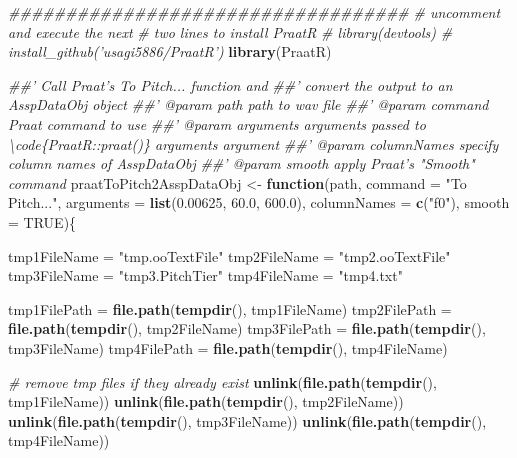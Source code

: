 \documentclass[]{book}
\newenvironment{Shaded}{\begin{snugshade}}{\end{snugshade}}
\newcommand{\CommentTok}[1]{\textcolor[rgb]{0.56,0.35,0.01}{\textit{#1}}}
\newcommand{\ControlFlowTok}[1]{\textcolor[rgb]{0.13,0.29,0.53}{\textbf{#1}}}
\newcommand{\DataTypeTok}[1]{\textcolor[rgb]{0.13,0.29,0.53}{#1}}
\newcommand{\FloatTok}[1]{\textcolor[rgb]{0.00,0.00,0.81}{#1}}
\newcommand{\KeywordTok}[1]{\textcolor[rgb]{0.13,0.29,0.53}{\textbf{#1}}}
\newcommand{\NormalTok}[1]{#1}
\newcommand{\OtherTok}[1]{\textcolor[rgb]{0.56,0.35,0.01}{#1}}
\newcommand{\StringTok}[1]{\textcolor[rgb]{0.31,0.60,0.02}{#1}}
\begin{document}
\begin{Shaded}
\begin{Highlighting}[]
\CommentTok{###################################}
\CommentTok{# uncomment and execute the next}
\CommentTok{# two lines to install PraatR}
\CommentTok{# library(devtools)}
\CommentTok{# install_github('usagi5886/PraatR')}
\KeywordTok{library}\NormalTok{(PraatR)}

\CommentTok{##' Call Praat's To Pitch... function and }
\CommentTok{##' convert the output to an AsspDataObj object}
\CommentTok{##' @param path path to wav file}
\CommentTok{##' @param command Praat command to use}
\CommentTok{##' @param arguments arguments passed to \textbackslash{}code\{PraatR::praat()\} arguments argument}
\CommentTok{##' @param columnNames specify column names of AsspDataObj}
\CommentTok{##' @param smooth apply Praat's "Smooth" command}
\NormalTok{praatToPitch2AsspDataObj <-}\StringTok{ }\ControlFlowTok{function}\NormalTok{(path,}
                                     \DataTypeTok{command =} \StringTok{"To Pitch..."}\NormalTok{,}
                                     \DataTypeTok{arguments =} \KeywordTok{list}\NormalTok{(}\FloatTok{0.00625}\NormalTok{,}
                                                      \FloatTok{60.0}\NormalTok{,}
                                                      \FloatTok{600.0}\NormalTok{),}
                                     \DataTypeTok{columnNames =} \KeywordTok{c}\NormalTok{(}\StringTok{"f0"}\NormalTok{),}
                                     \DataTypeTok{smooth =} \OtherTok{TRUE}\NormalTok{)\{}
  
\NormalTok{  tmp1FileName =}\StringTok{ "tmp.ooTextFile"}
\NormalTok{  tmp2FileName =}\StringTok{ "tmp2.ooTextFile"}
\NormalTok{  tmp3FileName =}\StringTok{ "tmp3.PitchTier"}
\NormalTok{  tmp4FileName =}\StringTok{ "tmp4.txt"}
  
\NormalTok{  tmp1FilePath =}\StringTok{ }\KeywordTok{file.path}\NormalTok{(}\KeywordTok{tempdir}\NormalTok{(), tmp1FileName)}
\NormalTok{  tmp2FilePath =}\StringTok{ }\KeywordTok{file.path}\NormalTok{(}\KeywordTok{tempdir}\NormalTok{(), tmp2FileName)}
\NormalTok{  tmp3FilePath =}\StringTok{ }\KeywordTok{file.path}\NormalTok{(}\KeywordTok{tempdir}\NormalTok{(), tmp3FileName)}
\NormalTok{  tmp4FilePath =}\StringTok{ }\KeywordTok{file.path}\NormalTok{(}\KeywordTok{tempdir}\NormalTok{(), tmp4FileName)}
  
  \CommentTok{# remove tmp files if they already exist}
  \KeywordTok{unlink}\NormalTok{(}\KeywordTok{file.path}\NormalTok{(}\KeywordTok{tempdir}\NormalTok{(), tmp1FileName))}
  \KeywordTok{unlink}\NormalTok{(}\KeywordTok{file.path}\NormalTok{(}\KeywordTok{tempdir}\NormalTok{(), tmp2FileName))}
  \KeywordTok{unlink}\NormalTok{(}\KeywordTok{file.path}\NormalTok{(}\KeywordTok{tempdir}\NormalTok{(), tmp3FileName))}
  \KeywordTok{unlink}\NormalTok{(}\KeywordTok{file.path}\NormalTok{(}\KeywordTok{tempdir}\NormalTok{(), tmp4FileName))}
  

\end{Highlighting}
\end{Shaded}
\end{document}

